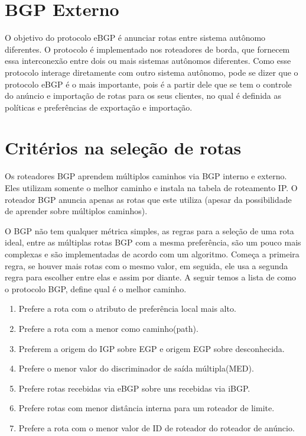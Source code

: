 \documentclass[12pt,a4paper]{report}
\begin{document}
\section{BGP Externo}
O objetivo do protocolo eBGP \'e anunciar rotas entre sistema aut\^onomo diferentes. O protocolo \'e implementado nos roteadores de borda, que fornecem essa interconex\~ao entre dois ou mais sistemas aut\^onomos diferentes. Como esse protocolo interage diretamente com outro sistema aut\^onomo, pode se dizer que o protocolo eBGP \'e o mais importante, pois \'e a partir dele que se tem o controle do an\'uncio e importa\c{c}\~ao de rotas para os seus clientes, no qual \'e definida as pol\'iticas e prefer\^encias de exporta\c{c}\~ao e importa\c{c}\~ao.

\section{Crit\'erios na sele\c{c}\~ao de rotas}
Os roteadores BGP aprendem m\'ultiplos caminhos via BGP interno e externo.  Eles utilizam somente o melhor caminho e instala na tabela de roteamento IP. O roteador BGP anuncia apenas as rotas que este utiliza (apesar da possibilidade de aprender sobre m\'ultiplos caminhos).

O BGP n\~ao tem qualquer m\'etrica simples, as regras para a sele\c{c}\~ao de uma rota ideal, entre as m\'ultiplas rotas BGP com a mesma prefer\^encia, s\~ao um pouco mais complexas e s\~ao implementadas de acordo com um algoritmo. Come\c{c}a a primeira regra, se houver mais rotas com o mesmo valor, em seguida, ele usa a segunda regra para escolher entre elas e assim por diante\cite{rfc4271}. A seguir temos a lista de como o protocolo BGP, define qual \'e o melhor caminho.

\begin{enumerate}
\item Prefere a rota com o atributo de prefer\^encia local mais alto.
\item Prefere a rota com a menor como caminho(path).
\item Preferem a origem do IGP sobre EGP e origem EGP sobre desconhecida.
\item Prefere o menor valor do discriminador de sa\'ida m\'ultipla(MED).
\item Prefere rotas recebidas via eBGP sobre uns recebidas via iBGP.
\item Prefere rotas com menor dist\^ancia interna para um roteador de limite.
\item Prefere a rota com o menor valor de ID de roteador do roteador de an\'uncio.
\end{enumerate}
\end{document}
